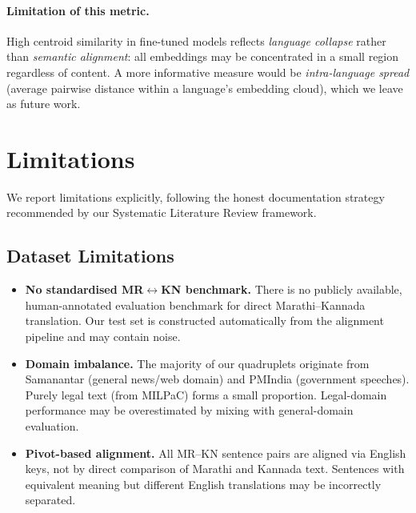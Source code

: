 \documentclass[11pt,a4paper]{article}
\begin{document}
\paragraph{Limitation of this metric.}
High centroid similarity in fine-tuned models reflects
\emph{language collapse} rather than \emph{semantic alignment}:
all embeddings may be concentrated in a small region regardless
of content.
A more informative measure would be \emph{intra-language spread}
(average pairwise distance within a language's embedding cloud),
which we leave as future work.

\section{Limitations}
\label{sec:limitations}

We report limitations explicitly, following the honest documentation
strategy recommended by our Systematic Literature Review framework.

\subsection{Dataset Limitations}
\begin{itemize}[leftmargin=*]
  \item \textbf{No standardised MR$\leftrightarrow$KN benchmark.}
    There is no publicly available, human-annotated evaluation
    benchmark for direct Marathi--Kannada translation.
    Our test set is constructed automatically from the alignment
    pipeline and may contain noise.

  \item \textbf{Domain imbalance.}
    The majority of our quadruplets originate from Samanantar
    (general news/web domain) and PMIndia (government speeches).
    Purely legal text (from MILPaC) forms a small proportion.
    Legal-domain performance may be overestimated by mixing with
    general-domain evaluation.

  \item \textbf{Pivot-based alignment.}
    All MR--KN sentence pairs are aligned via English keys,
    not by direct comparison of Marathi and Kannada text.
    Sentences with equivalent meaning but different English
    translations may be incorrectly separated.
\end{itemize}
\end{document}
